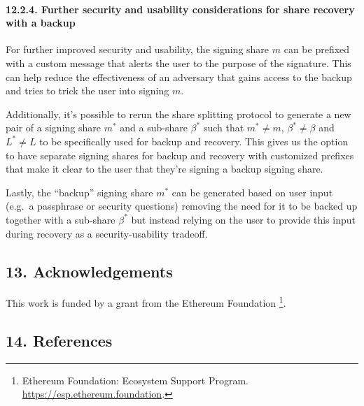\documentclass[
]{article}
\begin{document}
\hypertarget{share-recovery-backup-enhancements}{%
\paragraph{12.2.4. Further security and usability considerations for
share recovery with a backup}\label{share-recovery-backup-enhancements}}

For further improved security and usability, the signing share \(m\) can
be prefixed with a custom message that alerts the user to the purpose of
the signature. This can help reduce the effectiveness of an adversary
that gains access to the backup and tries to trick the user into signing
\(m\).

Additionally, it's possible to rerun the share splitting protocol to
generate a new pair of a signing share \(m^ \ast\) and a sub-share
\(\beta ^ \ast\) such that \(m^ \ast \neq m\),
\(\beta ^ \ast \neq \beta\) and \(L^ \ast \neq L\) to be specifically
used for backup and recovery. This gives us the option to have separate
signing shares for backup and recovery with customized prefixes that
make it clear to the user that they're signing a backup signing share.

Lastly, the ``backup'' signing share \(m^ \ast\) can be generated based
on user input (e.g.~a passphrase or security questions) removing the
need for it to be backed up together with a sub-share \(\beta ^ \ast\)
but instead relying on the user to provide this input during recovery as
a security-usability tradeoff.

\hypertarget{acknowledgements}{%
\subsection{13. Acknowledgements}\label{acknowledgements}}

This work is funded by a grant from the Ethereum Foundation \footnote{Ethereum
  Foundation: Ecosystem Support Program.
  \url{https://esp.ethereum.foundation}.}.

\hypertarget{references}{%
\subsection{14. References}\label{references}}
\end{document}
